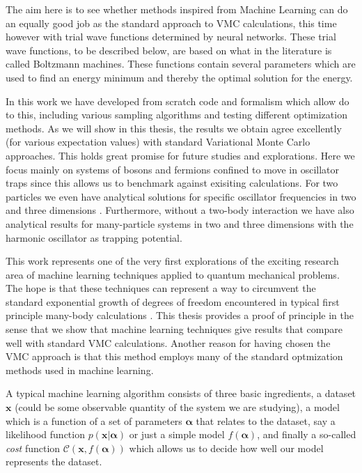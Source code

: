 \documentclass[twoside,english]{uiofysmaster}
\begin{document}
The aim here is to see whether methods inspired from Machine Learning
can do an equally good job as the standard approach to VMC
calculations, this time however with trial wave functions determined
by neural networks.  These trial wave functions, to be described
below, are based on what in the literature is called Boltzmann
machines. These functions contain several parameters which are used to
find an energy minimum and thereby the optimal solution for the
energy.

In this work we have developed from scratch code and formalism which allow
do to this, including various sampling algorithms and testing
different optimization methods. As we will show in this thesis, the
results we obtain agree excellently (for various expectation values)
with standard Variational Monte Carlo approaches. This holds great
promise for future studies and explorations. Here we focus mainly on
systems of bosons and fermions confined to move in oscillator traps
since this allows us to benchmark against exisiting calculations.  For
two particles we even have analytical solutions for specific
oscillator frequencies in two and three dimensions \cite{Taut1993,
  Taut1994}. Furthermore, without a two-body interaction we have also
analytical results for many-particle systems in two and three
dimensions with the harmonic oscillator as trapping potential.

This work represents one of the very first explorations of the
exciting research area of machine learning techniques applied to
quantum mechanical problems. The hope is that these techniques can
represent a way to circumvent the standard exponential growth of
degrees of freedom encountered in typical first principle many-body
calculations \cite{HjortJensen2017}. This thesis provides a proof of principle
in the sense that we show that machine learning techniques give
results that compare well with standard VMC calculations.  Another
reason for having chosen the VMC approach is that this method employs
many of the standard optmization methods used in machine learning.

A typical machine learning algorithm consists of three basic
ingredients, a dataset $\mathbf{x}$ (could be some observable quantity
of the system we are studying), a model which is a function of a set
of parameters $\mathbf{\alpha}$ that relates to the dataset, say a
likelihood function $p(\mathbf{x}\vert \mathbf{\alpha})$ or just a
simple model $f(\mathbf{\alpha})$, and finally a so-called {\em cost}
function $\mathcal{C} (\mathbf{x}, f(\mathbf{\alpha}))$ which allows
us to decide how well our model represents the dataset.
\end{document}
